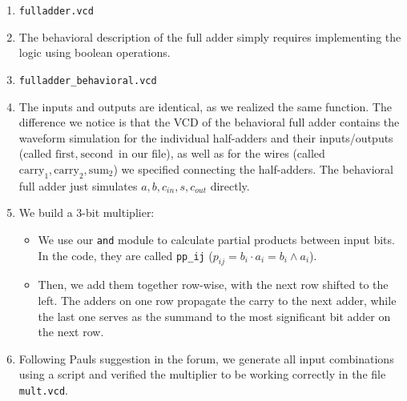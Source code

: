 \documentclass[a4paper]{scrartcl}
\begin{document}
\begin{enumerate}[label=(\alph*)]
\item 
\verb|fulladder.vcd|

\item 
The behavioral description of the full adder simply requires implementing the logic using boolean operations.

\item 
\verb|fulladder_behavioral.vcd|

\item 
The inputs and outputs are identical, as we realized the same function. The difference we notice is that the VCD of the behavioral full adder contains the waveform simulation for the individual half-adders and their inputs/outputs (called $\text{first},\ \text{second}$ in our file), as well as for the wires (called $\text{carry}_1, \text{carry}_2, \text{sum}_2$) we specified connecting the half-adders. The behavioral full adder just simulates $a, b, c_{in}, s, c_{out}$ directly.

\item 
We build a 3-bit multiplier:
\begin{itemize}
    \item We use our \verb|and| module to calculate partial products between input bits. In the code, they are called \verb|pp_ij| ($p_{ij} = b_i \cdot a_i = b_i \land a_i$).
    \item Then, we add them together row-wise, with the next row shifted to the left. The adders on one row propagate the carry to the next adder, while the last one serves as the summand to the most significant bit adder on the next row.
\end{itemize}

\item 
Following Pauls suggestion in the forum, we generate all input combinations using a script and verified the multiplier to be working correctly in the file \verb|mult.vcd|. 



\end{enumerate}
\end{document}
